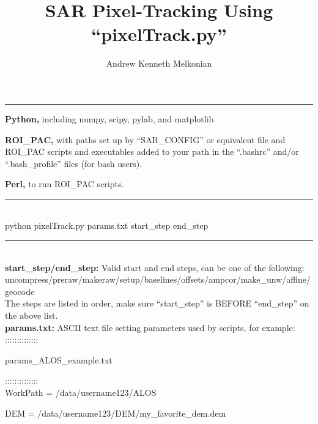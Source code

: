 \documentclass[12pt]{article}
\title{SAR Pixel-Tracking Using ``pixelTrack.py''}
\author{Andrew Kenneth Melkonian}
\begin{document}
\maketitle

\vspace{1pt}
\hrule
\vspace{2pt}


{\bf Python,} including numpy, scipy, pylab, and matplotlib

{\bf ROI\_PAC,} with paths set up by ``SAR\_CONFIG'' or equivalent file and ROI\_PAC scripts and executables added to your path in the ``.bashrc'' and/or ``.bash\_profile'' files (for bash users).

{\bf Perl,} to run ROI\_PAC scripts. \\

\vspace{1pt}
\hrule
\vspace{2pt}

 \\

\noindent python pixelTrack.py params.txt start\_step end\_step \\

\vspace{1pt}
\hrule
\vspace{2pt}

 \\

{\bf start\_step/end\_step:} Valid start and end steps, can be one of the following: \\

uncompress/preraw/makeraw/setup/baselines/offsets/ampcor/make\_unw/affine/geocode \\

The steps are listed in order, make sure ``start\_step'' is BEFORE ``end\_step'' on the above list. \\

{\bf params.txt:} ASCII text file setting parameters used by scripts, for example: \\

::::::::::::::

params\_ALOS\_example.txt

:::::::::::::: \\

WorkPath	=	/data/username123/ALOS

DEM		=	/data/username123/DEM/my\_favorite\_dem.dem
\end{document}
